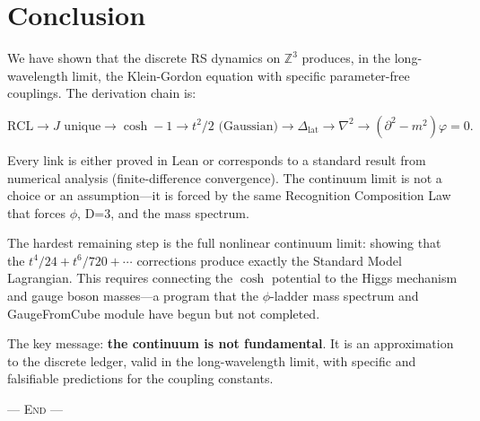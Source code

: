 \documentclass[11pt,a4paper]{article}
\theoremstyle{plain}
\theoremstyle{definition}
\theoremstyle{remark}
\newcommand{\Z}{\mathbb{Z}}
\newcommand{\Jcost}{J}
\newcommand{\Lap}{\Delta_{\mathrm{lat}}}
\begin{document}
\section{Conclusion}
\label{sec:conclusion}

We have shown that the discrete RS dynamics on $\Z^3$ produces, in the
long-wavelength limit, the Klein-Gordon equation with specific
parameter-free couplings.  The derivation chain is:

\[
\text{RCL} \to \Jcost \text{ unique} \to \cosh - 1
\to t^2/2 \text{ (Gaussian)} \to \Lap \to \nabla^2
\to (\partial^2 - m^2)\varphi = 0.
\]

Every link is either proved in Lean or corresponds to a standard result
from numerical analysis (finite-difference convergence).  The continuum
limit is not a choice or an assumption---it is forced by the same
Recognition Composition Law that forces $\phi$, D=3, and the mass
spectrum.

The hardest remaining step is the full nonlinear continuum limit:
showing that the $t^4/24 + t^6/720 + \cdots$ corrections produce
exactly the Standard Model Lagrangian.  This requires connecting the
$\cosh$ potential to the Higgs mechanism and gauge boson masses---a
program that the $\phi$-ladder mass spectrum and GaugeFromCube module
have begun but not completed.

The key message: \textbf{the continuum is not fundamental}.  It is an
approximation to the discrete ledger, valid in the long-wavelength
limit, with specific and falsifiable predictions for the coupling
constants.

\bigskip
\begin{center}
\textsc{--- End ---}
\end{center}
\end{document}
